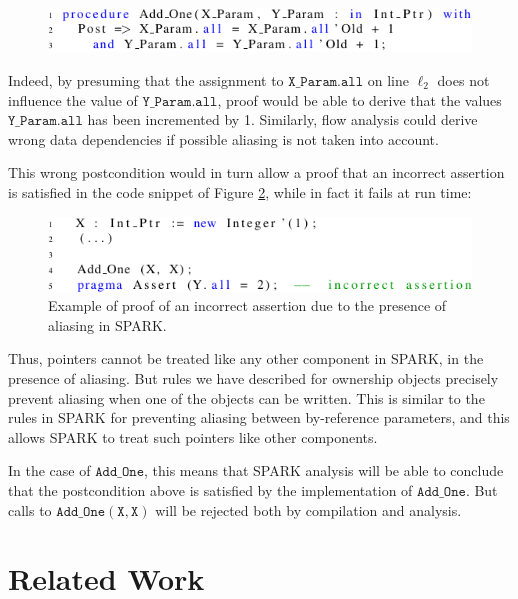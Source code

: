 \documentclass{llncs}
\newcommand\var[1]{\ensuremath{\mathtt{#1}}}
\begin{document}
\begin{figure}[htb!]
\centering
  \captionsetup{justification=centering,margin=0.6cm}
   \includegraphics[]{spark_ex1_proof}
   \label{fig:spark_ex1_proof}
\end{figure}

Indeed, by presuming that the assignment to \var{X\_Param.all} on line $\ell_2$ does not influence the value of \var{Y\_Param.all}, proof would be able to
derive that the values \var{Y\_Param.all} has been incremented by 1. Similarly, flow analysis could derive wrong data dependencies if possible aliasing is not taken into account.

This wrong postcondition would in turn allow a proof that an incorrect assertion is satisfied in the code snippet of Figure \ref{fig:spark_ex1_exp}, while in fact it fails at run time:

\begin{figure}[htb!]
\centering
  \captionsetup{justification=centering,margin=0.6cm}
   \includegraphics[]{spark_ex1_exp}
	\caption{Example of proof of an incorrect assertion due to the presence of aliasing in SPARK.}
   \label{fig:spark_ex1_exp}
\end{figure}

Thus, pointers cannot be treated like any other component in SPARK, in the presence of aliasing. But rules we have described for ownership objects precisely prevent
aliasing when one of the objects can be written. This is similar to the rules in SPARK for preventing aliasing between by-reference parameters, and this allows SPARK to treat such pointers
like other components.

In the case of \var{Add\_One}, this means that SPARK analysis will be able to conclude that the postcondition above is satisfied by the implementation of \var{Add\_One}.
But calls to \var{Add\_One(X,X)} will be rejected both by compilation and analysis.


\section{Related Work}
\end{document}
